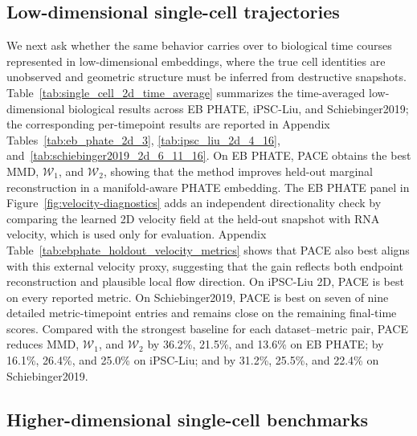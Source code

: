 \subsection{Low-dimensional single-cell trajectories}

We next ask whether the same behavior carries over to biological time courses represented in low-dimensional embeddings, where the true cell identities are unobserved and geometric structure must be inferred from destructive snapshots. 
Table~\ref{tab:single_cell_2d_time_average} summarizes the time-averaged low-dimensional biological results across EB PHATE, iPSC-Liu, and Schiebinger2019; the corresponding per-timepoint results are reported in Appendix Tables~\ref{tab:eb_phate_2d_3}, \ref{tab:ipsc_liu_2d_4_16}, and~\ref{tab:schiebinger2019_2d_6_11_16}. On EB PHATE, PACE obtains the best MMD, $\mathcal{W}_1$, and $\mathcal{W}_2$, showing that the method improves held-out marginal reconstruction in a manifold-aware PHATE embedding. The EB PHATE panel in Figure~\ref{fig:velocity-diagnostics} adds an independent directionality check by comparing the learned 2D velocity field at the held-out snapshot with RNA velocity, which is used only for evaluation. Appendix Table~\ref{tab:ebphate_holdout_velocity_metrics} 
shows that PACE also best aligns with this external velocity proxy, 
suggesting that the gain reflects both endpoint reconstruction and plausible local flow direction. 
On iPSC-Liu 2D, PACE is best on every reported metric. 
On Schiebinger2019, PACE is best on seven of nine detailed metric-timepoint entries and remains close on the remaining final-time scores. 
Compared with the strongest baseline for each dataset--metric pair, PACE reduces MMD, $\mathcal{W}_1$, and $\mathcal{W}_2$ by 36.2\%, 21.5\%, and 13.6\% on EB PHATE; by 16.1\%, 26.4\%, and 25.0\% on iPSC-Liu; and by 31.2\%, 25.5\%, and 22.4\% on Schiebinger2019.



\subsection{Higher-dimensional single-cell benchmarks}

